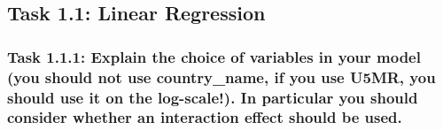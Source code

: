 \documentclass[
]{article}
\begin{document}
\hypertarget{task-1.1-linear-regression}{%
\subsection{Task 1.1: Linear
Regression}\label{task-1.1-linear-regression}}

\hypertarget{task-1.1.1-explain-the-choice-of-variables-in-your-model-you-should-not-use-country_name-if-you-use-u5mr-you-should-use-it-on-the-log-scale.-in-particular-you-should-consider-whether-an-interaction-effect-should-be-used.}{%
\subsubsection{Task 1.1.1: Explain the choice of variables in your model
(you should not use country\_name, if you use U5MR, you should use it on
the log-scale!). In particular you should consider whether an
interaction effect should be
used.}\label{task-1.1.1-explain-the-choice-of-variables-in-your-model-you-should-not-use-country_name-if-you-use-u5mr-you-should-use-it-on-the-log-scale.-in-particular-you-should-consider-whether-an-interaction-effect-should-be-used.}}
\end{document}
